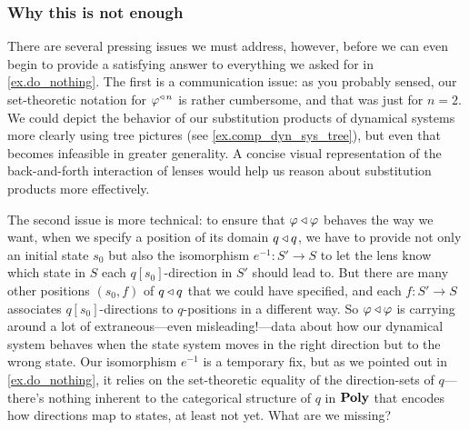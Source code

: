 \documentclass[Book-Poly]{subfiles}
\begin{document}
\subsubsection{Why this is not enough}\label{subsubsec.comon.comp.def.dyn_sys.issues}
There are several pressing issues we must address, however, before we can even begin to provide a satisfying answer to everything we asked for in \cref{ex.do_nothing}.
The first is a communication issue: as you probably sensed, our set-theoretic notation for $\varphi^{\mathbin{\triangleleft}\,n}$ is rather cumbersome, and that was just for $n=2$.
We could depict the behavior of our substitution products of dynamical systems more clearly using tree pictures (see \cref{ex.comp_dyn_sys_tree}), but even that becomes infeasible in greater generality.
A concise visual representation of the back-and-forth interaction of lenses would help us reason about substitution products more effectively.

The second issue is more technical: to ensure that $\varphi\mathbin{\triangleleft}\varphi$ behaves the way we want, when we specify a position of its domain $q\mathbin{\triangleleft} q$, we have to provide not only an initial state $s_0$ but also the isomorphism $e^{-1}\colon S'\to S$ to let the lens know which state in $S$ each $q[s_0]$-direction in $S'$ should lead to.
But there are many other positions $(s_0,f)$ of $q\mathbin{\triangleleft} q$ that we could have specified, and each $f\colon S'\to S$ associates $q[s_0]$-directions to $q$-positions in a different way.
So $\varphi\mathbin{\triangleleft}\varphi$ is carrying around a lot of extraneous---even misleading!---data about how our dynamical system behaves when the state system moves in the right direction but to the wrong state.
Our isomorphism $e^{-1}$ is a temporary fix, but as we pointed out in \cref{ex.do_nothing}, it relies on the set-theoretic equality of the direction-sets of $q$---there's nothing inherent to the categorical structure of $q$ in $\mathbf{Poly}$ that encodes how directions map to states, at least not yet.
What are we missing?
\end{document}
